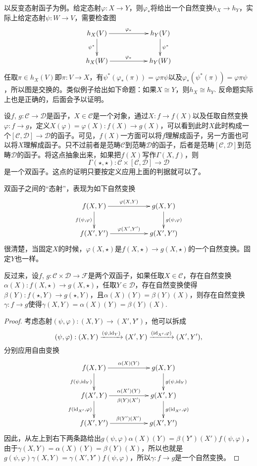 以反变态射函子为例。给定态射$\varphi:X\to Y$，则$\varphi_*$将给出一个自然变换$h_X\to h_Y$，实际上给定态射$\psi:W\to V$，需要检查图
\[
\begin{xy}
	\xymatrix{
		h_X(V)\ar[rr]^{\varphi_*} \ar[d]_{\psi^*}&&h_Y(V) \ar[d]^{\psi^*}\\
		h_X(W)\ar[rr]^{\varphi_*}&&h_Y(W)
	}
\end{xy}
\]
任取$\pi\in h_X(V)$即$\pi:V\to X$，有$\psi^*(\varphi_*(\pi))=\varphi\pi\psi$以及$\varphi_*(\psi^*(\pi))=\varphi\pi\psi$，所以图是交换的。类似例子给出如下命题：如果$X\cong Y$，则$h_X\cong h_Y$. 反命题实际上也是正确的，后面会予以证明。

\para 设$f$, $g:\mathcal{C}\to \mathcal{D}$是函子，$X\in \mathcal{C}$是一个对象，通过$X:f\to f(X)$以及任取自然变换$\varphi:f\to g$，定义$X(\varphi)=\varphi(X):f(X)\to g(X)$，可以看到此时$X$此时构成一个$[\mathcal{C},\mathcal{D}] \to \mathcal{D}$的函子。可见，$f(X)$一方面可以将$f$理解成函子，另一方面也可以将$X$理解成函子。只不过前者是范畴$\mathcal{C}$到范畴$\mathcal{D}$的函子，后者是范畴$[\mathcal{C},\mathcal{D}]$到范畴$\mathcal{D}$的函子。将这点抽象出来，如果把$f(X)$写作$\Gamma(X,f)$，则
\[
	\Gamma(\star,\star):\mathcal{C}\times [\mathcal{C},\mathcal{D}]\to \mathcal{D}
\]
是一个双函子。这点的证明只要按定义应用上面的判据就可以了。

\para 双函子之间的“态射”，表现为如下自然变换
\[
\begin{xy}
	\xymatrix{
		f(X,Y)\ar[rr]^{\varphi(X,Y)} \ar[d]_{f(\psi,\varphi)}&&g(X,Y) \ar[d]^{g(\psi,\varphi)}\\
		f(X',Y')\ar[rr]^{\varphi(X',Y')}&&g(X',Y')
	}
\end{xy}
\]
很清楚，当固定$X$的时候，$\varphi(X,\star)$是$f(X,\star)\to g(X,\star)$的一个自然变换。固定$Y$也一样。

反过来，设$f$, $g:\mathcal{C}\times \mathcal{D}\to \mathcal{F}$是两个双函子，如果任取$X\in \mathcal{C}$，存在自然变换$\alpha(X):f(X,\star)\to g(X,\star)$，任取$Y\in \mathcal{D}$，存在自然变换使得$\beta(Y):f(\star,Y)\to g(\star,Y)$，且$\alpha(X)(Y)=\beta(Y)(X)$，则存在自然变换$\gamma:f\to g$使得$\gamma(X,Y)=\alpha(X)(Y)=\beta(Y)(X)$.

\begin{proof}
	考虑态射$(\psi,\varphi):(X,Y)\to (X',Y')$，他可以拆成
	\[
		(\psi,\varphi): (X,Y) \xrightarrow{(\psi,\operatorname{id}_Y)} (X',Y)\xrightarrow{(\operatorname{id}_{X'},\varphi)} (X',Y'),
	\]
	分别应用自由变换
	\[
	\begin{xy}
		\xymatrix{
			f(X,Y)\ar[rr]^{\alpha(X)(Y)} \ar[d]_{f(\psi,\id_Y)}&&g(X,Y) \ar[d]^{g(\psi,\id_Y)}\\
			f(X',Y)\ar[rr]^{\alpha(X')(Y)}_{\beta(Y)(X')} \ar[d]_{f(\id_{X'},\varphi)}&&g(X',Y) \ar[d]^{g(\id_{X'},\varphi)}\\
			f(X',Y')\ar[rr]^{\beta(Y')(X')}&&g(X',Y')
		}
	\end{xy}
	\]
	因此，从左上到右下两条路给出$g(\psi,\varphi)\alpha(X)(Y)=\beta(Y')(X')f(\psi,\varphi)$，由于$\gamma(X,Y)=\alpha(X)(Y)=\beta(Y)(X)$，所以也就是$g(\psi,\varphi)\gamma(X,Y)=\gamma(X',Y')f(\psi,\varphi)$，所以$\gamma:f\to g$是一个自然变换。
\end{proof}

